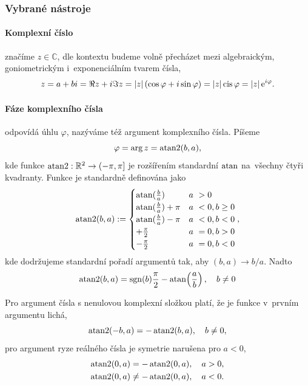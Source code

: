 \subsubsection{Vybrané nástroje}\label{sss:vybrane_nastroje}
\paragraph{Komplexní číslo} značíme $z\in\mathbb{C}$, dle kontextu budeme volně přecházet mezi algebraickým, goniometrickým i~exponenciálním tvarem čísla,
\begin{equation}
    z=a+bi=\Re{z}+i\Im{z}=\left\lvert z\right\rvert(\cos\varphi+i\sin{\varphi})=\left\lvert z\right\rvert\operatorname{cis}\varphi=\left\lvert z\right\rvert\mathrm{e}^{i\varphi}.
\end{equation}

\paragraph{Fáze komplexního čísla} odpovídá úhlu $\varphi$, nazýváme též argument komplexního čísla. Píšeme
\begin{equation}
    \varphi=\arg{z}=\operatorname{atan2}(b,a),
\end{equation}
kde funkce $\operatorname{atan2}:\mathbb{R}^2\to(-\pi,\pi]$ je rozšířením standardní $\operatorname{atan}$ na~všechny čtyři kvadranty. Funkce je standardně definována jako
\begin{equation}\label{eq:atantwo_definition}
\operatorname{atan2}(b,a):=\begin{cases}
\operatorname{atan}(\frac{b}{a}) & a~> 0 \\ 
\operatorname{atan}(\frac{b}{a}) + \pi & a~< 0, b \ge 0 \\
\operatorname{atan}(\frac{b}{a}) - \pi & a~< 0, b < 0 \\
+\frac{\pi}{2} & a~= 0, b > 0 \\
-\frac{\pi}{2} & a~= 0, b < 0 \\
\end{cases},
\end{equation}
kde dodržujeme standardní pořadí argumentů tak, aby $(b,a)\to b/a$. Nadto 
\begin{equation}\label{eq:atantwo_flipped}
    \operatorname{atan2}(b,a)=\operatorname{sgn}(b)\frac{\pi}{2}-\operatorname{atan}\!\left(\frac{a}{b}\right),\quad b\neq0
\end{equation}


Pro argument čísla s nenulovou komplexní složkou platí, že je funkce v~prvním argumentu lichá, 
\begin{equation}
    \operatorname{atan2}(-b,a)=-\operatorname{atan2}(b,a), \quad b\neq0,
\end{equation}
pro argument ryze reálného čísla je symetrie narušena pro $a<0$,
\begin{align}\label{eq:atantwo_odd}
    \operatorname{atan2}(0,a)=-\operatorname{atan2}(0,a), \quad a>0,\nonumber\\
    \operatorname{atan2}(0,a)\neq-\operatorname{atan2}(0,a), \quad a<0.
\end{align}

